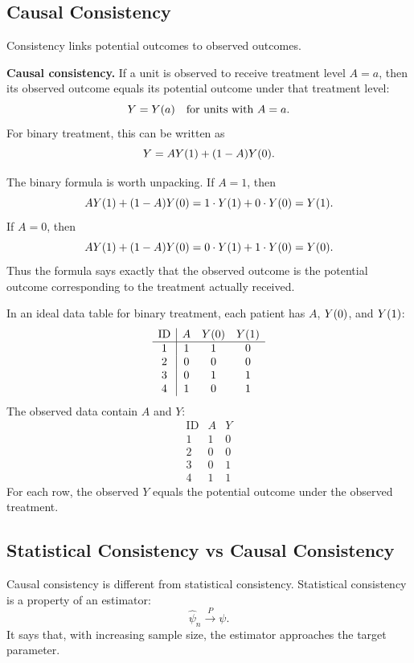 \subsection{Causal Consistency}

Consistency links potential outcomes to observed outcomes.

\begin{assumptionbox}
\textbf{Causal consistency.} If a unit is observed to receive treatment level $A=a$, then its observed outcome equals its potential outcome under that treatment level:
\[
Y=Y(a)\quad\text{for units with }A=a.
\]
For binary treatment, this can be written as
\[
Y=AY(1)+(1-A)Y(0).
\]
\end{assumptionbox}

The binary formula is worth unpacking. If $A=1$, then
\[
AY(1)+(1-A)Y(0)=1\cdot Y(1)+0\cdot Y(0)=Y(1).
\]
If $A=0$, then
\[
AY(1)+(1-A)Y(0)=0\cdot Y(1)+1\cdot Y(0)=Y(0).
\]
Thus the formula says exactly that the observed outcome is the potential outcome corresponding to the treatment actually received.

\begin{example}
In an ideal data table for binary treatment, each patient has $A$, $Y(0)$, and $Y(1)$:
\[
\begin{array}{c|ccc}
\text{ID} & A & Y(0) & Y(1)\\
\hline
1 & 1 & 1 & 0\\
2 & 0 & 0 & 0\\
3 & 0 & 1 & 1\\
4 & 1 & 0 & 1
\end{array}
\]
The observed data contain $A$ and $Y$:
\[
\begin{array}{c|cc}
\text{ID} & A & Y\\
\hline
1 & 1 & 0\\
2 & 0 & 0\\
3 & 0 & 1\\
4 & 1 & 1
\end{array}
\]
For each row, the observed $Y$ equals the potential outcome under the observed treatment.
\end{example}

\subsection{Statistical Consistency vs Causal Consistency}

Causal consistency is different from statistical consistency. Statistical consistency is a property of an estimator:
\[
\hat\psi_n \overset{P}{\longrightarrow} \psi.
\]
It says that, with increasing sample size, the estimator approaches the target parameter.

